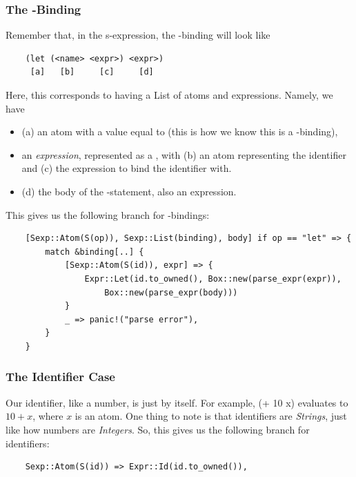 \documentclass[letterpaper]{article}
\begin{document}
\subsubsection{The -Binding}
Remember that, in the s-expression, the -binding will look like 
\begin{verbatim}
    (let (<name> <expr>) <expr>)
     [a]   [b]     [c]     [d]\end{verbatim}
Here, this corresponds to having a List of atoms and expressions. Namely, we have 
\begin{itemize}
    \item (a) an atom with a  value equal to  (this is how we know this is a -binding),
    \item an \emph{expression}, represented as a , with (b) an atom representing the identifier and (c) the expression to bind the identifier with.
    \item (d) the body of the -statement, also an expression.
\end{itemize}

This gives us the following branch for -bindings:
\begin{verbatim}
    [Sexp::Atom(S(op)), Sexp::List(binding), body] if op == "let" => {
        match &binding[..] {
            [Sexp::Atom(S(id)), expr] => {
                Expr::Let(id.to_owned(), Box::new(parse_expr(expr)),
                    Box::new(parse_expr(body)))
            }
            _ => panic!("parse error"),
        }
    }\end{verbatim}

\subsubsection{The Identifier Case}
Our identifier, like a number, is just by itself. For example, \code(+ 10 x) evaluates to $10 + x$, where $x$ is an atom. One thing to note is that identifiers are \emph{Strings}, just like how numbers are \emph{Integers}. So, this gives us the following branch for identifiers:
\begin{verbatim}
    Sexp::Atom(S(id)) => Expr::Id(id.to_owned()),\end{verbatim}
\end{document}
